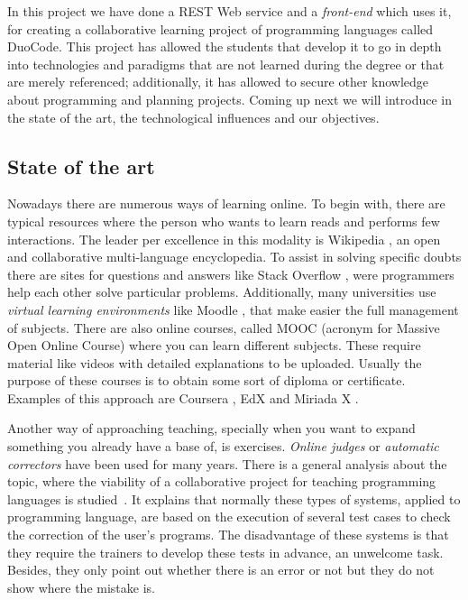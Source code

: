 
In this project we have done a REST Web service and a \emph{front-end} which uses it, for creating a collaborative learning project of programming languages called DuoCode. This project has allowed the students that develop it to go in depth into technologies and paradigms that are not learned during the degree or that are merely referenced; additionally, it has allowed to secure other knowledge about programming and planning projects. Coming up next we will introduce in the state of the art, the technological influences and our objectives.

\subsection{State of the art\label{subsec:state_art}}

Nowadays there are numerous ways of learning online. To begin with, there are typical resources where the person who wants to learn reads and performs few interactions. The leader per excellence in this modality is Wikipedia \cite{wiki}, an open and collaborative multi-language encyclopedia. To assist in solving specific doubts there are sites for questions and answers like Stack Overflow \cite{stack}, were programmers help each other solve particular problems. Additionally, many universities use \emph{virtual learning environments} like Moodle \cite{moodle}, that make easier the full management of subjects. There are also online courses, called MOOC (acronym for Massive Open Online Course) where you can learn different subjects. These require material like videos with detailed explanations to be uploaded. Usually the purpose of these courses is to obtain some sort of diploma or certificate. Examples of this approach are Coursera \cite{coursera}, EdX \cite{edX} and Miriada X \cite{miriadaX}.

Another way of approaching teaching, specially when you want to expand something you already have a base of, is exercises. \emph{Online judges} or \emph{automatic correctors} have been used for many years. There is a general analysis about the topic, where the viability of a collaborative project for teaching programming languages is studied~\cite{pimcdDuoCode14}. It explains that normally these types of systems, applied to programming language, are based on the execution of several test cases to check the correction of the user's programs. The disadvantage of these systems is that they require the trainers to develop these tests in advance, an unwelcome task. Besides, they only point out whether there is an error or not but they do not show where the mistake is.

